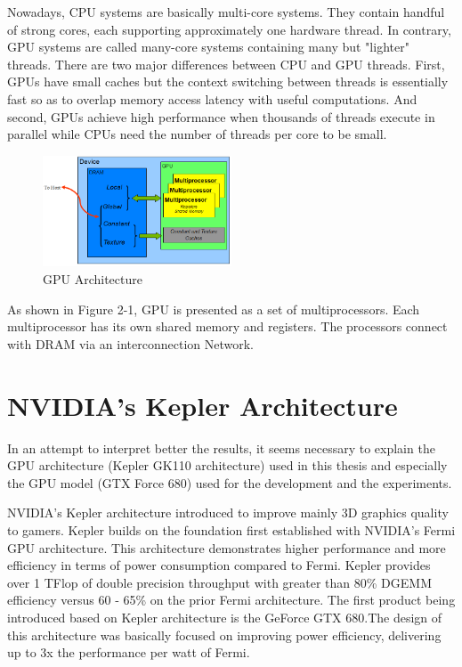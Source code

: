 Nowadays, CPU systems are basically multi-core systems. They contain handful of strong cores, each supporting approximately one hardware thread. In contrary, GPU systems are called many-core systems containing many but "lighter" threads. There are two major differences between CPU and GPU threads. First, GPUs have small caches but the context switching between threads is essentially fast so as to overlap memory access latency with useful computations. And second, GPUs achieve high performance when thousands of threads execute in parallel while CPUs need the number of threads per core to be small.\\
\begin{figure}[H]
   \centering
       \includegraphics[width=0.5\textwidth]{gpu}
   \caption{GPU Architecture}
   \label{fig:gpuarch}
\end{figure}

As shown in Figure 2-1, GPU is presented as a set of multiprocessors. Each multiprocessor has its own shared memory and registers. The processors connect with DRAM via an interconnection Network.
\section{NVIDIA's Kepler Architecture}

In an attempt to interpret better the results, it seems necessary to explain the GPU architecture (Kepler GK110 architecture) used in this thesis and especially the GPU model (GTX Force 680) used for the development and the experiments.

NVIDIA’s Kepler architecture introduced to improve mainly 3D graphics quality to gamers. Kepler builds on the foundation first established with NVIDIA's Fermi GPU architecture. This architecture demonstrates higher performance and more efficiency in terms of power consumption compared to Fermi. Kepler provides over 1 TFlop of double precision throughput with greater than 80\% DGEMM efficiency versus 60 ‐ 65\% on the prior Fermi architecture. The first product being introduced based on Kepler architecture is the GeForce GTX 680.The design of this architecture was basically focused on improving power efficiency, delivering up to 3x the performance per watt of Fermi.

